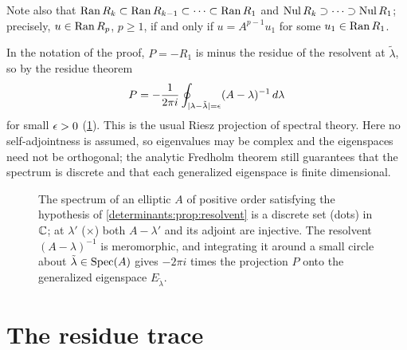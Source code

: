 Note also that $\operatorname{Ran} R_k\subset\operatorname{Ran} R_{k-1}\subset\dots\subset\operatorname{Ran} R_1$ and
$\operatorname{Nul} R_k\supset\dots\supset\operatorname{Nul} R_1$; precisely, $u\in\operatorname{Ran} R_p$, $p\ge1$, if
and only if $u=A^{p-1}u_1$ for some $u_1\in\operatorname{Ran} R_1$.

\begin{discussion}
In the notation of the proof, $P=-R_1$ is minus the residue of the
resolvent at $\tilde\lambda$, so by the residue theorem
\begin{equation*}
  P=-\frac1{2\pi i}\oint_{|\lambda-\tilde\lambda|=\epsilon}(A-\lambda)^{-1}\,d\lambda
\end{equation*}
for small $\epsilon>0$ (\cref{determinants:fig:resolvent}). This is the usual
Riesz projection of spectral theory. Here no self-adjointness is assumed, so
eigenvalues may be complex and the eigenspaces need not be orthogonal; the
analytic Fredholm theorem still guarantees that the spectrum is discrete
and that each generalized eigenspace is finite dimensional.
\end{discussion}

\begin{figure}[htbp]
\centering
{}
\caption[Spectrum and resolvent]{The spectrum of an elliptic $A$ of
positive order satisfying the hypothesis of
\cref{determinants:prop:resolvent} is a discrete set (dots) in $\mathbb{C}$; at
$\lambda'$ ($\times$) both $A-\lambda'$ and its adjoint are injective. The
resolvent $(A-\lambda)^{-1}$ is meromorphic, and integrating it around a
small circle about $\tilde\lambda\in\operatorname{Spec}(A)$ gives $-2\pi i$ times the
projection $P$ onto the generalized eigenspace $E_{\tilde\lambda}$.}
\label{determinants:fig:resolvent}
\end{figure}

\section{The residue trace}\label{determinants:sec:residue}

